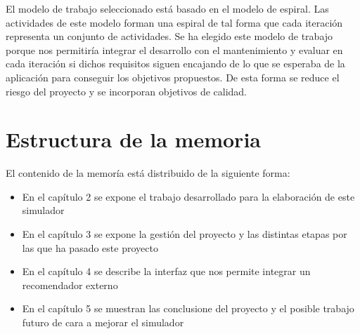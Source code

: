 El modelo de trabajo seleccionado está basado en el modelo de espiral. Las actividades de este modelo forman una espiral de tal forma que cada iteración representa un conjunto de actividades. Se ha elegido este modelo de trabajo porque nos permitiría integrar el desarrollo con el mantenimiento y evaluar en cada iteración si dichos requisitos siguen encajando de lo que se esperaba de la aplicación para conseguir los objetivos propuestos. De esta forma se reduce el riesgo del proyecto y se incorporan objetivos de calidad.

\section{Estructura de la memoria}

El contenido de la memoría está distribuido de la siguiente forma:

\begin{itemize}
	\item En el capítulo 2 se expone el trabajo desarrollado para la elaboración de este simulador
	\item En el capítulo 3 se expone la gestión del proyecto y las distintas etapas por las que ha pasado este proyecto
       \item En el capítulo 4 se describe la interfaz que nos permite integrar un recomendador externo
	\item En el capítulo 5 se muestran las conclusione del proyecto y el posible trabajo futuro de cara a mejorar el simulador 
\end{itemize}